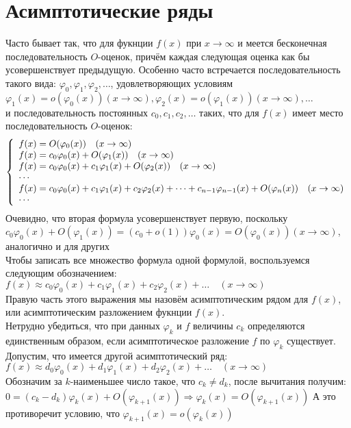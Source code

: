 \documentclass{report}
\begin{document}
\section{Асимптотические ряды}
Часто бывает так, что для фукнции $f(x)$ при $x\to\infty$ и  меется бесконечная последовательность $O$-оценок, причём каждая следующая оценка как бы усовершенствует предыдущую.
Особенно часто встречается последовательность такого вида: $\varphi_0, \varphi_1, \varphi_2, \dots$, удовлетворяющих условиям \\
$\varphi_1(x)=o(\varphi_0(x))(x\to\infty),\varphi_2(x)=o(\varphi_1(x))(x\to\infty),\dots$ \\
и последовательность постоянных $c_0,c_1,c_2,\dots$ таких, что для $f(x)$ имеет место последовательность $O$-оценок: \\
\[
\left\{
\begin{array}{l}
    f(x)=O(\varphi_0(x))\quad{(x\to\infty)} \cr
    f(x)=c_0\varphi_0(x)+O(\varphi_1(x))\quad(x\to\infty) \cr
    f(x)=c_0\varphi_0(x)+c_1\varphi_1(x)+O(\varphi_2(x))\quad(x\to\infty) \cr
    \cdots \cr
    f(x)=c_0\varphi_0(x)+c_1\varphi_1(x)+c_2\varphi_2(x)+\dots+c_{n-1}\varphi_{n-1}(x)+O(\varphi_n(x))\quad(x\to\infty) \cr
    \cdots
\end{array}
\right.
\]
Очевидно, что вторая формула усовершенствует первую, поскольку $c_0\varphi_0(x)+O(\varphi_1(x))=(c_0+o(1))\varphi_0(x)=O(\varphi_0(x))(x\to\infty)$, аналогично и для других \\
Чтобы записать все множество формула одной формулой, воспользуемся следующим обозначением: \\
$f(x)\approx c_0\varphi_0(x)+c_1\varphi_1(x)+c_2\varphi_2(x)+\dots\quad(x\to\infty)$ \\
Правую часть этого выражения мы назовём асимптотическим рядом для $f(x)$, или асимптотическим разложением фукнции $f(x)$. \\
Нетрудно убедиться, что при данных $\varphi_k$ и $f$ величины $c_k$ определяются единственным образом, если асимптотическое разложение $f$ по $\varphi_k$ существует. \\
Допустим, что имеется другой асимптотический ряд:
$f(x)\approx d_0\varphi_0(x)+d_1\varphi_1(x)+d_2\varphi_2(x)+\dots\quad(x\to\infty)$ \\
Обозначим за $k$-наименьшее число такое, что $c_k\neq d_k$, после вычитания получим: \\
$0=(c_k-d_k)\varphi_k(x)+O(\varphi_{k+1}(x))\Rightarrow\varphi_k(x)=O(\varphi_{k+1}(x))$
А это противоречит условию, что $\varphi_{k+1}(x)=o(\varphi_k(x))$ \\
\end{document}
